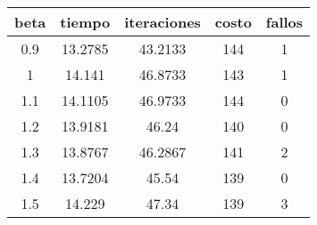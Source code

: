 \begin{table}[h!]
\centering
\begin{tabular}{ccccc}
beta & tiempo & iteraciones & costo & fallos \\ 
\hline 
0.9 & 13.2785 & 43.2133 & 144 & 1 \\ 
1 & 14.141 & 46.8733 & 143 & 1 \\ 
1.1 & 14.1105 & 46.9733 & 144 & 0 \\ 
1.2 & 13.9181 & 46.24 & 140 & 0 \\ 
1.3 & 13.8767 & 46.2867 & 141 & 2 \\ 
1.4 & 13.7204 & 45.54 & 139 & 0 \\ 
1.5 & 14.229 & 47.34 & 139 & 3 \\ 
\hline 
\end{tabular}
\end{table}